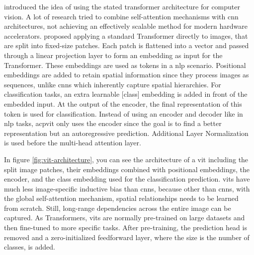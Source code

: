 \documentclass[conference]{IEEEtran}
\begin{document}
  \citeauthor{visiontransformers2021} introduced the idea of using the stated transformer architecture for computer vision. A lot of research tried to combine self-attention mechanisms with \ac{cnn} architectures, not achieving an effectively scalable method for modern hardware accelerators. \cite{visiontransformers2021} proposed applying a standard Transformer directly to images, that are split into fixed-size patches. Each patch is flattened into a vector and passed through a linear projection layer to form an embedding as input for the Transformer. These embeddings are used as tokens in a \ac{nlp} scenario. Positional embeddings are added to retain spatial information since they process images as sequences, unlike \acp{cnn} which inherently capture spatial hierarchies. For classification tasks, an extra learnable [class] embedding is added in front of the embedded input. At the output of the encoder, the final representation of this token is used for classification. Instead of using an encoder and decoder like in \ac{nlp} tasks, acp{vit} only uses the encoder since the goal is to find a better representation but an autoregressive prediction. Additional Layer Normalization is used before the multi-head attention layer. \cite{vit-state-challenges}
  
  In figure \ref{fig:vit-architecture}, you can see the architecture of a \ac{vit} including the split image patches, their embeddings combined with positional embeddings, the encoder, and the class embedding used for the classification prediction. \acp{vit} have much less image-specific inductive bias than \acp{cnn}, because other than \acp{cnn}, with the global self-attention mechanism, spatial relationships needs to be learned from scratch. Still, long-range dependencies across the entire image can be captured.  As Transformers, \acp{vit} are normally pre-trained on large datasets and then fine-tuned to more specific tasks. After pre-training, the prediction head is removed and a zero-initialized feedforward layer, where the size is the number of classes, is added.
\end{document}
